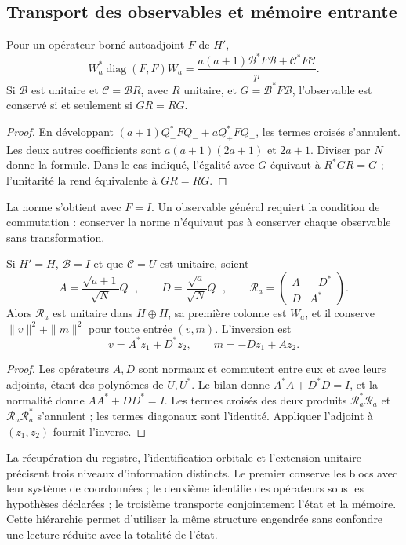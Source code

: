 \subsection{Transport des observables et mémoire entrante}
\label{subsec:acoplamiento-lectores}

\begin{theorem}
\label{thm:acoplamiento-lector}
Pour un opérateur borné autoadjoint \(F\) de \(H'\),
\[
 W_a^*\operatorname{diag}(F,F)W_a
 =\frac{a(a+1)\mathcal B^*F\mathcal B+\mathcal C^*F\mathcal C}{p}.
\]
Si \(\mathcal B\) est unitaire et \(\mathcal C=\mathcal BR\), avec
\(R\) unitaire, et \(G=\mathcal B^*F\mathcal B\), l’observable est
conservé si et seulement si \(GR=RG\).
\end{theorem}
\begin{proof}
En développant \((a+1)Q_-^*FQ_-+aQ_+^*FQ_+\), les termes croisés
s’annulent. Les deux autres coefficients sont
\(a(a+1)(2a+1)\) et \(2a+1\). Diviser par \(N\) donne la formule.
Dans le cas indiqué, l’égalité avec \(G\) équivaut à \(R^*GR=G\) ;
l’unitarité la rend équivalente à \(GR=RG\).
\end{proof}

La norme s’obtient avec \(F=I\). Un observable général requiert
la condition de commutation : conserver la norme n’équivaut pas à conserver
chaque observable sans transformation.

\begin{theorem}
\label{thm:acoplamiento-memoria}
Si \(H'=H\), \(\mathcal B=I\) et que \(\mathcal C=U\) est unitaire, soient
\[
 A=\frac{\sqrt{a+1}}{\sqrt N}Q_-,\qquad
 D=\frac{\sqrt a}{\sqrt N}Q_+,\qquad
 \mathscr R_a=\begin{pmatrix}A&-D^*\\D&A^*\end{pmatrix}.
\]
Alors \(\mathscr R_a\) est unitaire dans \(H\oplus H\), sa première
colonne est \(W_a\), et il conserve \(\|v\|^2+\|m\|^2\) pour toute
entrée \((v,m)\). L’inversion est
\[
 v=A^*z_1+D^*z_2,\qquad m=-Dz_1+Az_2.
\]
\end{theorem}
\begin{proof}
Les opérateurs \(A,D\) sont normaux et commutent entre eux et avec leurs
adjoints, étant des polynômes de \(U,U^*\). Le bilan donne
\(A^*A+D^*D=I\), et la normalité donne \(AA^*+DD^*=I\).
Les termes croisés des deux produits
\(\mathscr R_a^*\mathscr R_a\) et \(\mathscr R_a\mathscr R_a^*\)
s’annulent ; les termes diagonaux sont l’identité. Appliquer l’adjoint à
\((z_1,z_2)\) fournit l’inverse.
\end{proof}

La récupération du registre, l’identification orbitale et l’extension
unitaire précisent trois niveaux d’information distincts. Le premier
conserve les blocs avec leur système de coordonnées ; le deuxième identifie des opérateurs sous
les hypothèses déclarées ; le troisième transporte conjointement l’état et la
mémoire. Cette hiérarchie permet d’utiliser la même structure engendrée sans
confondre une lecture réduite avec la totalité de l’état.
